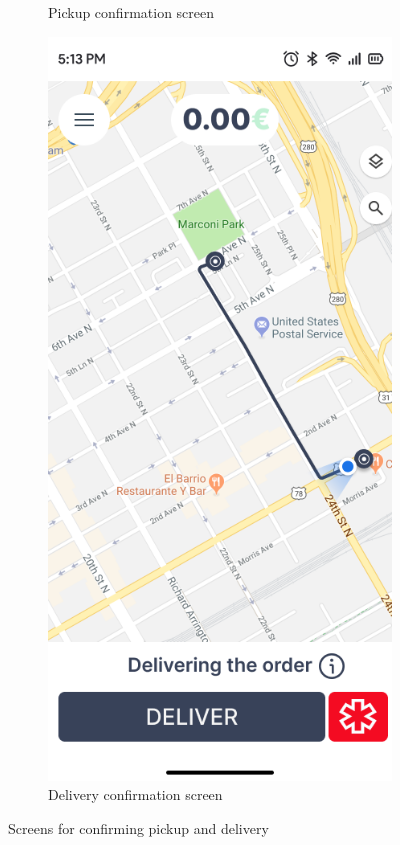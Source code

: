 \begin{figure}[H]
\begin{subfigure}[b]{0.48\textwidth}
        \caption{Pickup confirmation screen}
        \label{fig:pickup_order}
    \end{subfigure}
    \hfill
    \begin{subfigure}[b]{0.48\textwidth}
        \centering
        \includegraphics[width=\textwidth]{images/deliver_order_screen.png}
        \caption{Delivery confirmation screen}
        \label{fig:deliver_order}
    \end{subfigure}
    \caption{Screens for confirming pickup and delivery}
    \label{fig:courier_pickup_deliver}
\end{figure}

